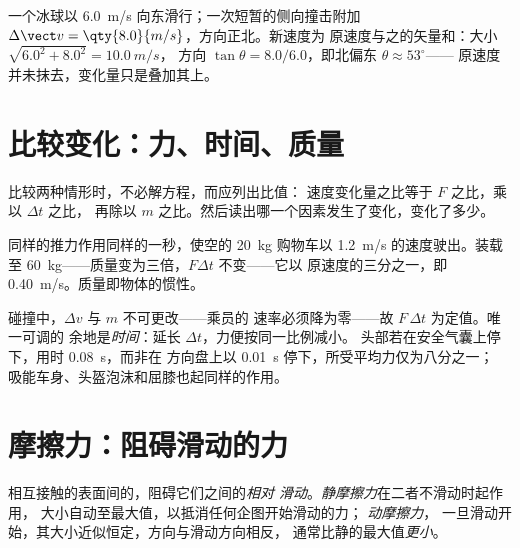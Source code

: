 \begin{example}[侧向一击]\label{ex:g11:forces-and-motion:kick}
一个冰球以 \qty{6.0}{m/s} 向东滑行；一次短暂的侧向撞击附加
$\Delta\vect v = \qty{8.0}{m/s}$，方向正北。新速度为
原速度与之的矢量和：大小 $\sqrt{6.0^2 + 8.0^2} = \qty{10.0}{m/s}$，
方向 $\tan\theta = 8.0/6.0$，即北偏东 $\theta \approx 53^\circ$——
原速度并未抹去，变化量只是叠加其上。
\end{example}

\section{比较变化：力、时间、质量}

\begin{method}[比值推理]\label{met:g11:forces-and-motion:ratio}
比较两种情形时，不必解方程，而应列出比值：
速度变化量之比等于 $F$ 之比，乘以 $\Delta t$ 之比，
再除以 $m$ 之比。然后读出哪一个因素发生了变化，变化了多少。
\end{method}

\begin{example}[装载的购物车]\label{ex:g11:forces-and-motion:cart}
同样的推力作用同样的一秒，使空的
\qty{20}{kg} 购物车以 \qty{1.2}{m/s} 的速度驶出。装载至
\qty{60}{kg}——质量变为三倍，$F\Delta t$ 不变——它以
原速度的三分之一，即 \qty{0.40}{m/s}。质量即物体的惯性。
\end{example}

\begin{remark}[碰撞、安全气囊、屈膝]\label{rem:g11:forces-and-motion:airbag}
碰撞中，$\Delta v$ 与 $m$ 不可更改——乘员的
速率必须降为零——故 $F\,\Delta t$ 为定值。唯一可调的
余地是\emph{时间}：延长 $\Delta t$，力便按同一比例减小。
头部若在安全气囊上停下，用时 \qty{0.08}{s}，而非在
方向盘上以 \qty{0.01}{s} 停下，所受平均力仅为八分之一；
吸能车身、头盔泡沫和屈膝也起同样的作用。
\end{remark}

\section{摩擦力：阻碍滑动的力}

\begin{definition}[静摩擦力与动摩擦力]\label{def:g11:forces-and-motion:friction}
相互接触的表面间的，阻碍它们之间的\emph{相对
滑动}。\emph{静摩擦力}在二者不滑动时起作用，
大小自动至最大值，以抵消任何企图开始滑动的力；
\emph{动摩擦力}，
一旦滑动开始，其大小近似恒定，方向与滑动方向相反，
通常比静的最大值\emph{更小}。
\end{definition}

